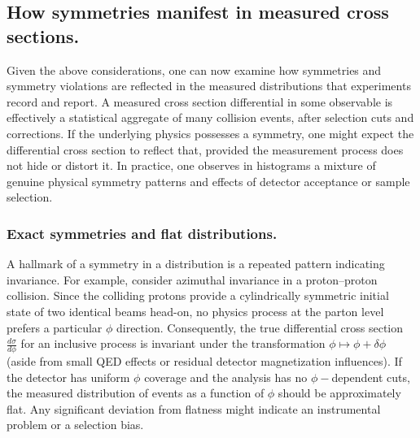     \subsection{How symmetries manifest in measured cross sections.}
    \label{subsec:cross-section-symmetries}
        Given the above considerations, one can now examine how symmetries and symmetry violations are reflected in the measured distributions that experiments record and report.
        A measured cross section differential in some observable is effectively a statistical aggregate of many collision events, after selection cuts and corrections.
        If the underlying physics possesses a symmetry, one might expect the differential cross section to reflect that, provided the measurement process does not hide or distort it.
        In practice, one observes in histograms a mixture of genuine physical symmetry patterns and effects of detector acceptance or sample selection.

        \subsubsection{Exact symmetries and flat distributions.}
            A hallmark of a symmetry in a distribution is a repeated pattern indicating invariance.
            For example, consider azimuthal invariance in a proton--proton collision.
            Since the colliding protons provide a cylindrically symmetric initial state of two identical beams head-on, no physics process at the parton level prefers a particular $\phi$ direction.
            Consequently, the true differential cross section $\frac{d\sigma}{d\phi}$ for an inclusive process is invariant under the transformation $\phi\mapsto\phi+\delta\phi$ (aside from small QED effects or residual detector magnetization influences).
            If the detector has uniform $\phi$ coverage and the analysis has no $\phi-$dependent cuts, the measured distribution of events as a function of $\phi$ should be approximately flat.
            Any significant deviation from flatness might indicate an instrumental problem or a selection bias.
            
